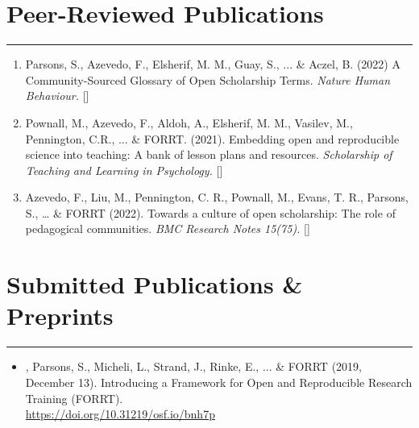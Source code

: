 \documentclass[letterpaper]{article}
\begin{document}
\section*{\color{Brown}Peer-Reviewed Publications}
\vspace{-.5em}
\hrule
\vspace{1em}
\begin{enumerate}


\item[]{\noindent Parsons, S., {Azevedo, F.}, Elsherif, M. M., Guay, S., ... \& Aczel, B. (2022) A Community-Sourced Glossary of Open Scholarship Terms. \it{Nature Human Behaviour}.} {} [{}]

\item[]{\noindent Pownall, M., {Azevedo, F.},  Aldoh, A., Elsherif, M. M.,  Vasilev, M., Pennington, C.R., ... \& FORRT. (2021). Embedding open and reproducible science into teaching: A bank of lesson plans and resources. \it{Scholarship of Teaching and Learning in Psychology}. {}} [{}]

\item[]{\noindent Azevedo, F., Liu, M., Pennington, C. R., Pownall, M., Evans, T. R., Parsons, S., … \& FORRT (2022). Towards a culture of open scholarship: The role of pedagogical communities. \it{BMC Research Notes 15}(75).} {} [{}]


\vspace{0.25em}

\end{enumerate}


\section*{\color{Brown}Submitted Publications \& Preprints}
\vspace{-.5em}
\hrule
\vspace{1em}
\begin{itemize}
\vspace{0.25em}

\item[]{, Parsons, S., Micheli, L., Strand, J., Rinke, E., ... \& FORRT (2019, December 13). Introducing a Framework for Open and Reproducible Research Training (FORRT). \\                               \href{https://doi.org/10.31219/osf.io/bnh7p}{\color{BlueViolet}https://doi.org/10.31219/osf.io/bnh7p} {}}


\end{itemize}
\end{document}
